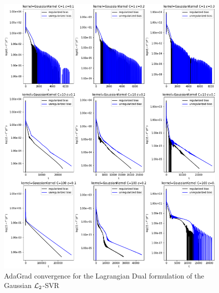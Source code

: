 \begin{figure}[H]
	\centering
	\includegraphics[scale=0.55]{img/gaussian_lagrangian_dual_l2_svr_loss_history}
	\caption{AdaGrad convergence for the Lagrangian Dual formulation of the Gaussian $\protect \mathcal{L}_2$-SVR}
	\label{fig:gaussian_lagrangian_dual_l2_svr_loss_history}
\end{figure}
